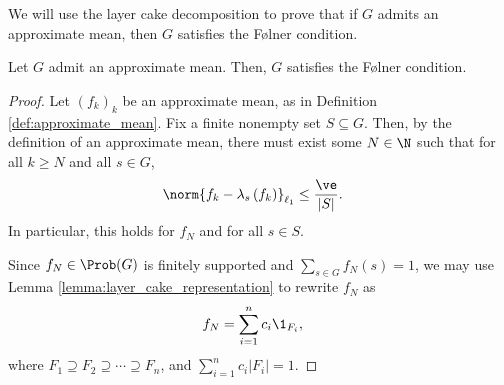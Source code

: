We will use the layer cake decomposition to prove that if $G$ admits an approximate mean, then $G$ satisfies the Følner condition.
\begin{proposition}\label{prop:approx_mean_implies_folner}
  Let $G$ admit an approximate mean. Then, $G$ satisfies the Følner condition.
\end{proposition}
\begin{proof}
  Let $\left(f_k\right)_k$ be an approximate mean, as in Definition \ref{def:approximate_mean}. Fix a finite nonempty set $S \subseteq G$. Then, by the definition of an approximate mean, there must exist some $N\in\N$ such that for all $k\geq N$ and all $s\in G$,
  \begin{align*}
    \norm{f_k - \lambda_s\left(f_k\right)}_{\ell_1} &\leq \frac{\ve}{|S|}.
  \end{align*}
  In particular, this holds for $f_N$ and for all $s\in S$.\newline

  Since $f_N\in \Prob(G)$ is finitely supported and $\sum_{s\in G}f_N(s) = 1$, we may use Lemma \ref{lemma:layer_cake_representation} to rewrite $f_N$ as
  \begin{align*}
    f_N &= \sum_{i=1}^{n}c_i\1_{F_i},
  \end{align*}
  where $F_1 \supseteq F_2\supseteq \cdots \supseteq F_n$, and $\sum_{i=1}^{n}c_i\left\vert F_i \right\vert = 1$.\newline


\end{proof}
